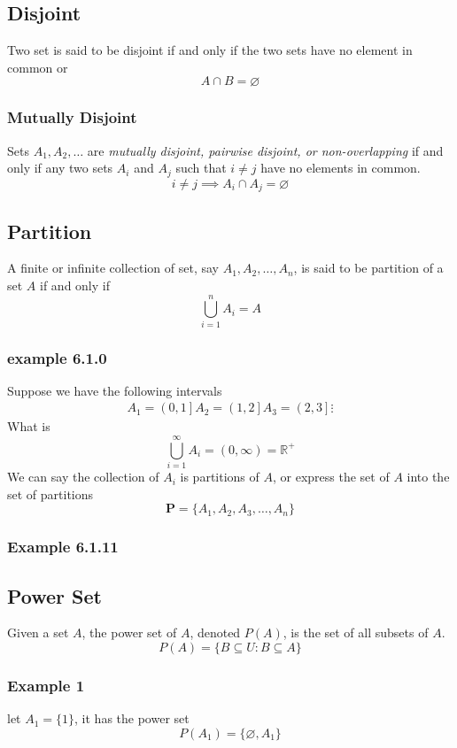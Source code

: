 \documentclass[12pt]{book}
\newcommand{\R}{\mathbb{R}}
\newcommand{\paren}[1]{\left( #1 \right)}
\begin{document}
    \subsection{Disjoint}
    Two set is said to be disjoint if and only if the two sets have no element in common or
    \[
    A \cap B = \varnothing
    \]
    \subsubsection{Mutually Disjoint}
    Sets $A_1,A_2,\ldots$ are \textit{mutually disjoint, pairwise disjoint, or non-overlapping} if and only if any two sets $A_i$ and $A_j$ such that $i\neq j$ have no elements in common.
    \[
    i \neq j \implies A_i \cap A_j = \varnothing
    \]

\subsection{Partition}
    A finite or infinite collection of set, say $A_1,A_2,\ldots,A_n$, is said to be partition of a set $A$ if and only if 
    \[
    \bigcup_{i=1}^{n} A_i = A
    \]
    \subsubsection{example 6.1.0}
    Suppose we have the following intervals 
    \begin{align*}
        A_1 = \left( 0,1 \right]
        A_2 = \left( 1,2 \right]
        A_3 = \left( 2,3 \right]
        \vdots
    \end{align*}
    What is
    \[
    \bigcup_{i=1}^{\infty} A_i = \paren{0,\infty} = \R^+
    \]
    We can say the collection of $A_i$ is partitions of $A$, or express the set of $A$ into the set of partitions
    \[
    \mathbf{P} = \{A_1,A_2,A_3,\ldots,A_n \}
    \]

    \subsubsection{Example 6.1.11}

\subsection{Power Set}
    Given a set $A$, the power set of $A$, denoted $P(A)$, is the set of all subsets of $A$.
    \[
    P(A) = \{ B \subseteq U : B \subseteq A\}
    \]
    \subsubsection{Example 1}
    let $A_1 = \{1\}$, it has the power set
    \[
    P(A_1) = \{ \varnothing, A_1\}
    \]
\end{document}
